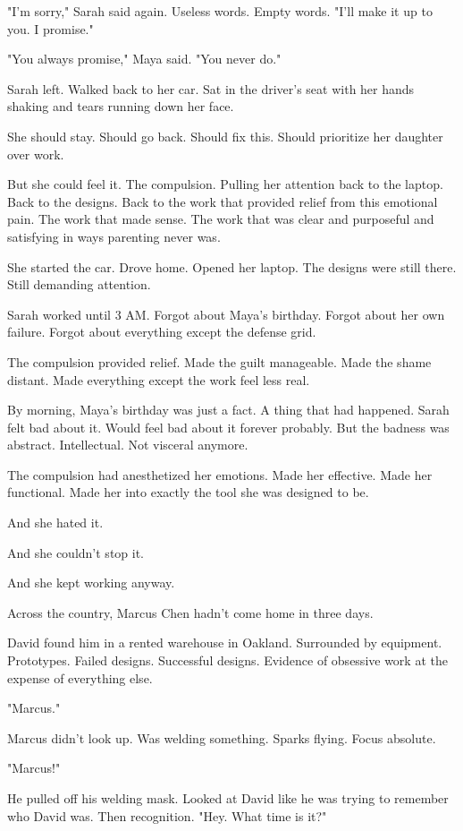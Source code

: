 "I'm sorry," Sarah said again. Useless words. Empty words. "I'll make it up to you. I promise."

"You always promise," Maya said. "You never do."

Sarah left. Walked back to her car. Sat in the driver's seat with her hands shaking and tears running down her face.

She should stay. Should go back. Should fix this. Should prioritize her daughter over work.

But she could feel it. The compulsion. Pulling her attention back to the laptop. Back to the designs. Back to the work that provided relief from this emotional pain. The work that made sense. The work that was clear and purposeful and satisfying in ways parenting never was.

She started the car. Drove home. Opened her laptop. The designs were still there. Still demanding attention.

Sarah worked until 3 AM. Forgot about Maya's birthday. Forgot about her own failure. Forgot about everything except the defense grid.

The compulsion provided relief. Made the guilt manageable. Made the shame distant. Made everything except the work feel less real.

By morning, Maya's birthday was just a fact. A thing that had happened. Sarah felt bad about it. Would feel bad about it forever probably. But the badness was abstract. Intellectual. Not visceral anymore.

The compulsion had anesthetized her emotions. Made her effective. Made her functional. Made her into exactly the tool she was designed to be.

And she hated it.

And she couldn't stop it.

And she kept working anyway.

\scenebreak

Across the country, Marcus Chen hadn't come home in three days.

David found him in a rented warehouse in Oakland. Surrounded by equipment. Prototypes. Failed designs. Successful designs. Evidence of obsessive work at the expense of everything else.

"Marcus."

Marcus didn't look up. Was welding something. Sparks flying. Focus absolute.

"Marcus!"

He pulled off his welding mask. Looked at David like he was trying to remember who David was. Then recognition. "Hey. What time is it?"

